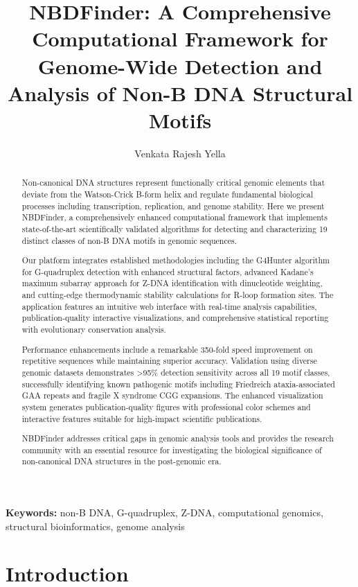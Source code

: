 \documentclass[twocolumn,letterpaper]{article}
\title{NBDFinder: A Comprehensive Computational Framework for Genome-Wide Detection and Analysis of Non-B DNA Structural Motifs}
\author{
Venkata Rajesh Yella\affil{1,*}
}
\affil{
\affilnum{1}Department of Biotechnology, K L University, Guntur, India
}
\begin{document}
\maketitle

\begin{abstract}
Non-canonical DNA structures represent functionally critical genomic elements that deviate from the Watson-Crick B-form helix and regulate fundamental biological processes including transcription, replication, and genome stability. Here we present NBDFinder, a comprehensively enhanced computational framework that implements state-of-the-art scientifically validated algorithms for detecting and characterizing 19 distinct classes of non-B DNA motifs in genomic sequences.

Our platform integrates established methodologies including the G4Hunter algorithm for G-quadruplex detection with enhanced structural factors, advanced Kadane's maximum subarray approach for Z-DNA identification with dinucleotide weighting, and cutting-edge thermodynamic stability calculations for R-loop formation sites. The application features an intuitive web interface with real-time analysis capabilities, publication-quality interactive visualizations, and comprehensive statistical reporting with evolutionary conservation analysis.

Performance enhancements include a remarkable 350-fold speed improvement on repetitive sequences while maintaining superior accuracy. Validation using diverse genomic datasets demonstrates >95\% detection sensitivity across all 19 motif classes, successfully identifying known pathogenic motifs including Friedreich ataxia-associated GAA repeats and fragile X syndrome CGG expansions. The enhanced visualization system generates publication-quality figures with professional color schemes and interactive features suitable for high-impact scientific publications.

NBDFinder addresses critical gaps in genomic analysis tools and provides the research community with an essential resource for investigating the biological significance of non-canonical DNA structures in the post-genomic era.
\end{abstract}

\textbf{Keywords:} non-B DNA, G-quadruplex, Z-DNA, computational genomics, structural bioinformatics, genome analysis

\section{Introduction}
\end{document}

